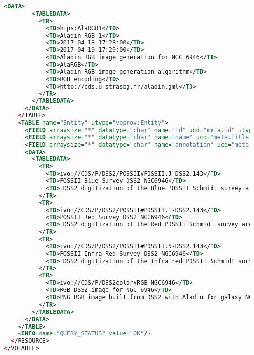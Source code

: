 \begin{lstlisting}[language=XML, caption= PROV-VOTABLE serialisation example for a Color composition Activity]
      <DATA>
        <TABLEDATA>
          <TR>
            <TD>hips:AlaRGB1</TD>
            <TD>Aladin RGB 1</TD>
            <TD>2017-04-18 17:28:00</TD>
            <TD>2017-04-19 17:29:00</TD>
            <TD>Aladin RGB image generation for NGC 6946</TD>
            <TD>AlaRGB</TD>
            <TD>Aladin RGB image generation algorithm</TD>
            <TD>RGB encoding</TD>
            <TD>http://cds.u-strasbg.fr/aladin.gml</TD>
          </TR>
        </TABLEDATA>
      </DATA>
    </TABLE>
    <TABLE name="Entity" utype="voprov:Entity">
      <FIELD arraysize="*" datatype="char" name="id" ucd="meta.id" utype="voprov:Entity.id"/>
      <FIELD arraysize="*" datatype="char" name="name" ucd="meta.title" utype="voprov:Entity.name"/>
      <FIELD arraysize="*" datatype="char" name="annotation" ucd="meta.description" utype="voprov:Entity.annotation"/>
      <DATA>
        <TABLEDATA>
          <TR>
            <TD>ivo://CDS/P/DSS2/POSSII#POSSII.J-DSS2.143</TD>
            <TD>POSSII Blue Survey DSS2 NGC6946</TD>
            <TD> DSS2 digitization of the Blue POSSII Schmidt survey around  NGC 6946</TD>
          </TR>
          <TR>
            <TD>ivo://CDS/P/DSS2/POSSII#POSSII.F-DSS2.143</TD>
            <TD>POSSII Red Survey DSS2 NGC6946</TD>
            <TD> DSS2 digitization of the Red POSSII Schmidt survey around NGC 6946</TD>
          </TR>
          <TR>
            <TD>ivo://CDS/P/DSS2/POSSII#POSSII.N-DSS2.143</TD>
            <TD>POSSII Infra Red Survey DSS2 NGC6946</TD>
            <TD> DSS2 digitization of the Infra red POSSII Schmidt survey around  NGC 6946</TD>
          </TR>
          <TR>
            <TD>ivo://CDS/P/DSS2color#RGB_NGC6946</TD>
            <TD>RGB DSS2 image for NGC 6946</TD>
            <TD>PNG RGB image built from DSS2 with Aladin for galaxy NGC 6946</TD>
          </TR>
        </TABLEDATA>
      </DATA>
    </TABLE>
    <INFO name="QUERY_STATUS" value="OK"/>
  </RESOURCE>
</VOTABLE>
\end{lstlisting}
